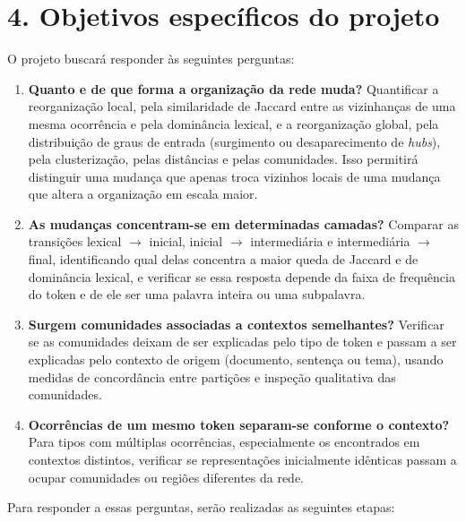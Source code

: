 \documentclass[11pt,a4paper]{article}
\begin{document}
\section*{4. Objetivos específicos do projeto}

O projeto buscará responder às seguintes perguntas:

\begin{enumerate}[label=\textbf{P\arabic*.}, leftmargin=2.1em]

    \item \textbf{Quanto e de que forma a organização da rede muda?}
    Quantificar a reorganização local, pela similaridade de Jaccard entre as
    vizinhanças de uma mesma ocorrência e pela dominância lexical, e a
    reorganização global, pela distribuição de graus de entrada (surgimento ou
    desaparecimento de \textit{hubs}), pela clusterização, pelas distâncias e
    pelas comunidades. Isso permitirá distinguir uma mudança que apenas troca
    vizinhos locais de uma mudança que altera a organização em escala maior.

    \item \textbf{As mudanças concentram-se em determinadas camadas?}
    Comparar as transições lexical $\to$ inicial, inicial $\to$ intermediária
    e intermediária $\to$ final, identificando qual delas concentra a maior
    queda de Jaccard e de dominância lexical, e verificar se essa resposta
    depende da faixa de frequência do token e de ele ser uma palavra inteira
    ou uma subpalavra.

    \item \textbf{Surgem comunidades associadas a contextos semelhantes?}
    Verificar se as comunidades deixam de ser explicadas pelo tipo de token e
    passam a ser explicadas pelo contexto de origem (documento, sentença ou
    tema), usando medidas de concordância entre partições e inspeção
    qualitativa das comunidades.

    \item \textbf{Ocorrências de um mesmo token separam-se conforme o
    contexto?}
    Para tipos com múltiplas ocorrências, especialmente os encontrados em
    contextos distintos, verificar se representações inicialmente idênticas
    passam a ocupar comunidades ou regiões diferentes da rede.

\end{enumerate}

Para responder a essas perguntas, serão realizadas as seguintes etapas:
\end{document}
